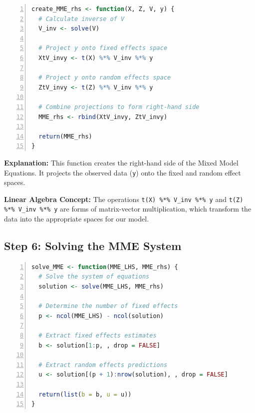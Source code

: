 \documentclass[12pt,a4paper]{article}
\begin{document}
\begin{lstlisting}[language=R, 
                   caption=Step 2: Defining Variance Components,
                   basicstyle=\ttfamily\footnotesize,
                   keywordstyle=\color{blue},
                   stringstyle=\color{red},
                   commentstyle=\color{green!60!black},
                   numbers=left,
                   numberstyle=\tiny\color{gray},
                   frame=single,
                   breaklines=true,
                   linewidth=0.95\textwidth,
                   columns=flexible,
                   xleftmargin=0.05\textwidth,
                   xrightmargin=0.05\textwidth]
create_MME_rhs <- function(X, Z, V, y) {
  # Calculate inverse of V
  V_inv <- solve(V)
  
  # Project y onto fixed effects space
  XtV_invy <- t(X) %*% V_inv %*% y
  
  # Project y onto random effects space
  ZtV_invy <- t(Z) %*% V_inv %*% y
  
  # Combine projections to form right-hand side
  MME_rhs <- rbind(XtV_invy, ZtV_invy)
  
  return(MME_rhs)
}
\end{lstlisting}

\textbf{Explanation:}
This function creates the right-hand side of the Mixed Model Equations. It projects the observed data (\texttt{y}) onto the fixed and random effect spaces.

\textbf{Linear Algebra Concept:} The operations \texttt{t(X) \%*\% V\_inv \%*\% y} and \texttt{t(Z) \%*\% V\_inv \%*\% y} are forms of matrix-vector multiplication, which transform the data into the appropriate spaces for our model.

\subsection{Step 6: Solving the MME System}

\begin{lstlisting}[language=R, 
                   caption=Step 2: Defining Variance Components,
                   basicstyle=\ttfamily\footnotesize,
                   keywordstyle=\color{blue},
                   stringstyle=\color{red},
                   commentstyle=\color{green!60!black},
                   numbers=left,
                   numberstyle=\tiny\color{gray},
                   frame=single,
                   breaklines=true,
                   linewidth=0.95\textwidth,
                   columns=flexible,
                   xleftmargin=0.05\textwidth,
                   xrightmargin=0.05\textwidth]
solve_MME <- function(MME_LHS, MME_rhs) {
  # Solve the system of equations
  solution <- solve(MME_LHS, MME_rhs)
  
  # Determine the number of fixed effects
  p <- ncol(MME_LHS) - ncol(solution)
  
  # Extract fixed effects estimates
  b <- solution[1:p, , drop = FALSE]
  
  # Extract random effects predictions
  u <- solution[(p + 1):nrow(solution), , drop = FALSE]
  
  return(list(b = b, u = u))
}
\end{lstlisting}
\end{document}
